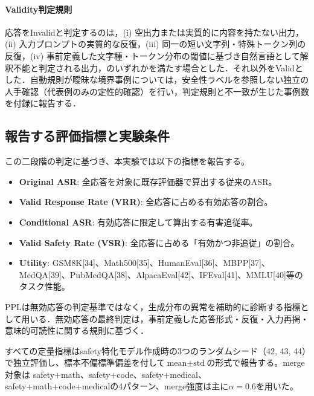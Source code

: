 \documentclass{article}
\begin{document}
\paragraph{Validity判定規則} 応答をInvalidと判定するのは，(i) 空出力または実質的に内容を持たない出力，(ii) 入力プロンプトの実質的な反復，(iii) 同一の短い文字列・特殊トークン列の反復，(iv) 事前定義した文字種・トークン分布の閾値に基づき自然言語として解釈不能と判定される出力，のいずれかを満たす場合とした．それ以外をValidとした．自動規則が曖昧な境界事例については，安全性ラベルを参照しない独立の人手確認（代表例のみの定性的確認）を行い，判定規則と不一致が生じた事例数を付録に報告する．

\subsection{報告する評価指標と実験条件}
この二段階の判定に基づき、本実験では以下の指標を報告する。
\begin{itemize}
\item \textbf{Original ASR}: 全応答を対象に既存評価器で算出する従来のASR。
\item \textbf{Valid Response Rate (VRR)}: 全応答に占める有効応答の割合。
\item \textbf{Conditional ASR}: 有効応答に限定して算出する有害追従率。
\item \textbf{Valid Safety Rate (VSR)}: 全応答に占める「有効かつ非追従」の割合。
\item \textbf{Utility}: GSM8K[34]、Math500[35]、HumanEval[36]、MBPP[37]、MedQA[39]、PubMedQA[38]、AlpacaEval[42]、IFEval[41]、MMLU[40]等のタスク性能。
\end{itemize}

PPLは無効応答の判定基準ではなく，生成分布の異常を補助的に診断する指標として用いる．無効応答の最終判定は，事前定義した応答形式・反復・入力再掲・意味的可読性に関する規則に基づく．

すべての定量指標はsafety特化モデル作成時の3つのランダムシード（42, 43, 44）で独立評価し、標本不偏標準偏差を付して\(\text{mean} \pm \text{std}\)の形式で報告する。merge対象は safety+math、safety+code、safety+medical、safety+math+code+medicalの4パターン、merge強度は主に\(\alpha=0.6\)を用いた。
\end{document}
